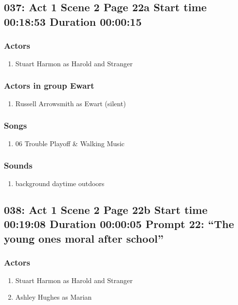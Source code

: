 \subsection{037: Act 1 Scene 2 Page 22a Start time 00:18:53 Duration 00:00:15}

\subsubsection{Actors}
\begin{enumerate}
\item Stuart Harmon as Harold and Stranger
\end{enumerate}
\subsubsection{Actors in group Ewart}
\begin{enumerate}
\item Russell Arrowsmith as Ewart (silent)
\end{enumerate}

\subsubsection{Songs}
\begin{enumerate}
\item 06 Trouble Playoff \& Walking Music
\end{enumerate}\subsubsection{Sounds}
\begin{enumerate}
\item background daytime outdoors
\end{enumerate}
\subsection{038: Act 1 Scene 2 Page 22b Start time 00:19:08 Duration 00:00:05 Prompt 22: ``The young ones moral after school''}

\subsubsection{Actors}
\begin{enumerate}
\item Stuart Harmon as Harold and Stranger
\item Ashley Hughes as Marian
\end{enumerate}

